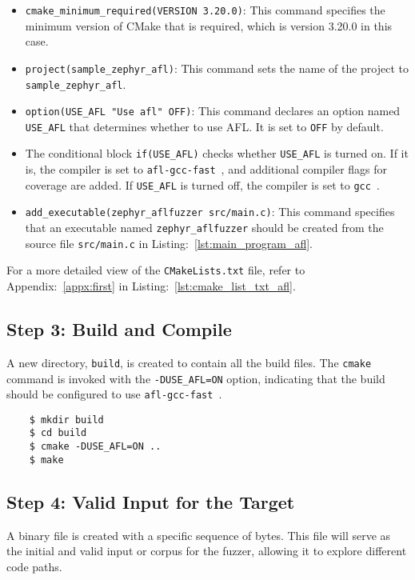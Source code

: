 \begin{itemize}
    \item \texttt{cmake\_minimum\_required(VERSION 3.20.0)}: This command
    specifies the minimum version of CMake that is required, which is version
    3.20.0 in this case.
    \item \texttt{project(sample\_zephyr\_afl)}: This command sets the name
    of the project to \texttt{sample\_zephyr\_afl}.
    \item \texttt{option(USE\_AFL "Use afl" OFF)}: This command declares an
    option named \texttt{USE\_AFL} that determines whether to use AFL. It is
    set to \texttt{OFF} by default.
    \item The conditional block \texttt{if(USE\_AFL)} checks
    whether \texttt{USE\_AFL} is turned on. If it is, the compiler is
    set to \texttt{afl-gcc-fast}~\cite{AFLplusp13:online}, and additional
    compiler flags for coverage are added. If \texttt{USE\_AFL} is turned off,
    the compiler is set to \texttt{gcc}~\cite{GCCtheGN9:online}.
    \item \texttt{add\_executable(zephyr\_aflfuzzer src/main.c)}: This
    command specifies that an executable named \texttt{zephyr\_aflfuzzer}
    should be created from the source file \texttt{src/main.c} in
    Listing:~\ref{lst:main_program_afl}.
\end{itemize}

For a more detailed view of the \texttt{CMakeLists.txt} file, refer to
Appendix:~\ref{appx:first} in
Listing:~\ref{lst:cmake_list_txt_afl}.

\subsection*{Step 3: Build and Compile}
A new directory, \texttt{build}, is created to contain all the build files.
The \texttt{cmake} command is invoked with the \texttt{-DUSE\_AFL=ON} option,
indicating that the build should be configured to
use \texttt{afl-gcc-fast}~\cite{AFLplusp13:online}.

\begin{verbatim}
    $ mkdir build
    $ cd build
    $ cmake -DUSE_AFL=ON ..
    $ make
\end{verbatim}

\subsection*{Step 4: Valid Input for the Target}
A binary file is created with a specific sequence of bytes.
This file will serve as the initial and valid input or corpus for the fuzzer,
allowing it to explore different code paths.

